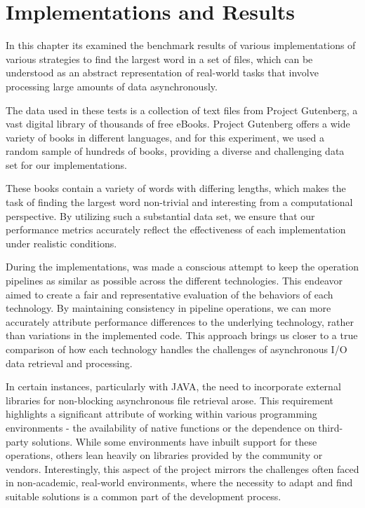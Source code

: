 \chapter{Implementations and Results}
\label{cha:a_short_latex_tutorial_with_examples}

In this chapter its examined the benchmark results of various implementations
of various strategies to find the largest word in a set of files, which can be understood as an abstract representation of real-world tasks that involve processing
large amounts of data asynchronously.

The data used in these tests is a collection of text files from Project Gutenberg, a vast digital library of thousands of free eBooks. Project Gutenberg offers a wide variety of books in different languages, and for this experiment, we used a random sample of hundreds of books, providing a diverse and challenging data set for our implementations.

These books contain a variety of words with differing lengths, which makes the task of finding the largest word non-trivial and interesting from a computational perspective. By utilizing such a substantial data set, we ensure that our performance metrics accurately reflect the effectiveness of each implementation under realistic conditions.

During the implementations, was made a conscious attempt to keep the operation pipelines as similar as possible across the different technologies. This endeavor aimed to create a fair and representative evaluation of the behaviors of each technology. By maintaining consistency in pipeline operations, we can more accurately attribute performance differences to the underlying technology, rather than variations in the implemented code. This approach brings us closer to a true comparison of how each technology handles the challenges of asynchronous I/O data retrieval and processing.

In certain instances, particularly with JAVA, the need to incorporate external libraries for non-blocking asynchronous file retrieval arose. This requirement highlights a significant attribute of working within various programming environments - the availability of native functions or the dependence on third-party solutions. While some environments have inbuilt support for these operations, others lean heavily on libraries provided by the community or vendors. Interestingly, this aspect of the project mirrors the challenges often faced in non-academic, real-world environments, where the necessity to adapt and find suitable solutions is a common part of the development process.

